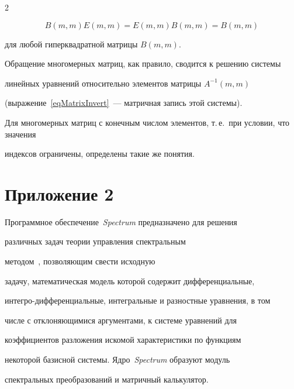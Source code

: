 \begin{multicols}{2}
{$$


  B(m,m)  E(m,m) = E(m,m)  B(m,m) = B(m,m)


$$


для любой гиперквадратной матрицы $B(m,m)$.





Обращение многомерных матриц, как правило, сводится к решению сис\-те\-мы 


линейных уравнений относительно элементов матрицы ${A^{-1}(m,m)}$ 


(выражение~\eqref{eqMatrixInvert}~--- матричная запись этой сис\-темы).





Для многомерных матриц с конечным числом элементов, т.\,е.\ при условии, что значения 


индексов ограничены, определены такие же понятия.


}








\section*{Приложение 2}





{\small





Программное обеспечение~\textit{Spectrum} предназначено для решения


различных задач теории управления спект\-раль\-ным 


методом~\cite{PanBor, SolSem, PanRybSot, PanRyb, SemRybin}, позволяющим свести исходную


задачу, математическая модель которой содержит дифференциальные,


ин\-тег\-ро-диф\-фе\-рен\-ци\-аль\-ные, интегральные и разностные уравнения, в том


чис\-ле с отклоняющимися аргументами, к сис\-те\-ме урав\-не\-ний для


коэффициентов разложения искомой характеристики по функциям


некоторой базисной сис\-темы. Ядро~\textit{Spectrum} образуют модуль


спект\-раль\-ных преобразований и мат\-рич\-ный калькулятор.





}
\end{multicols}
